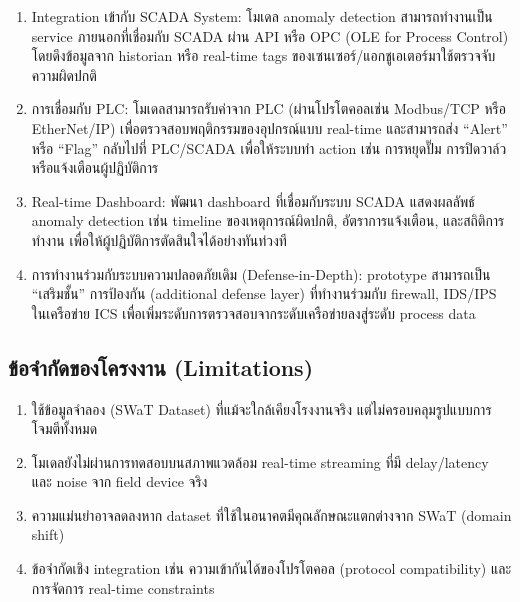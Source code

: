 \begin{enumerate}
  \item Integration เข้ากับ SCADA System: โมเดล anomaly detection สามารถทำงานเป็น service ภายนอกที่เชื่อมกับ SCADA ผ่าน API หรือ OPC (OLE for Process Control) โดยดึงข้อมูลจาก historian หรือ real-time tags ของเซนเซอร์/แอกชูเอเตอร์มาใช้ตรวจจับความผิดปกติ
  \item การเชื่อมกับ PLC: โมเดลสามารถรับค่าจาก PLC (ผ่านโปรโตคอลเช่น Modbus/TCP หรือ EtherNet/IP) เพื่อตรวจสอบพฤติกรรมของอุปกรณ์แบบ real-time และสามารถส่ง “Alert” หรือ “Flag” กลับไปที่ PLC/SCADA เพื่อให้ระบบทำ action เช่น การหยุดปั๊ม การปิดวาล์ว หรือแจ้งเตือนผู้ปฏิบัติการ
  \item Real-time Dashboard: พัฒนา dashboard ที่เชื่อมกับระบบ SCADA แสดงผลลัพธ์ anomaly detection เช่น timeline ของเหตุการณ์ผิดปกติ, อัตราการแจ้งเตือน, และสถิติการทำงาน เพื่อให้ผู้ปฏิบัติการตัดสินใจได้อย่างทันท่วงที
  \item การทำงานร่วมกับระบบความปลอดภัยเดิม (Defense-in-Depth): prototype สามารถเป็น “เสริมชั้น” การป้องกัน (additional defense layer) ที่ทำงานร่วมกับ firewall, IDS/IPS ในเครือข่าย ICS เพื่อเพิ่มระดับการตรวจสอบจากระดับเครือข่ายลงสู่ระดับ process data
\end{enumerate}

\subsection{ข้อจำกัดของโครงงาน (Limitations)}
\begin{enumerate}
  \item ใช้ข้อมูลจำลอง (SWaT Dataset) ที่แม้จะใกล้เคียงโรงงานจริง แต่ไม่ครอบคลุมรูปแบบการโจมตีทั้งหมด
  \item โมเดลยังไม่ผ่านการทดสอบบนสภาพแวดล้อม real-time streaming ที่มี delay/latency และ noise จาก field device จริง
  \item ความแม่นยำอาจลดลงหาก dataset ที่ใช้ในอนาคตมีคุณลักษณะแตกต่างจาก SWaT (domain shift)
  \item ข้อจำกัดเชิง integration เช่น ความเข้ากันได้ของโปรโตคอล (protocol compatibility) และการจัดการ real-time constraints
\end{enumerate}


